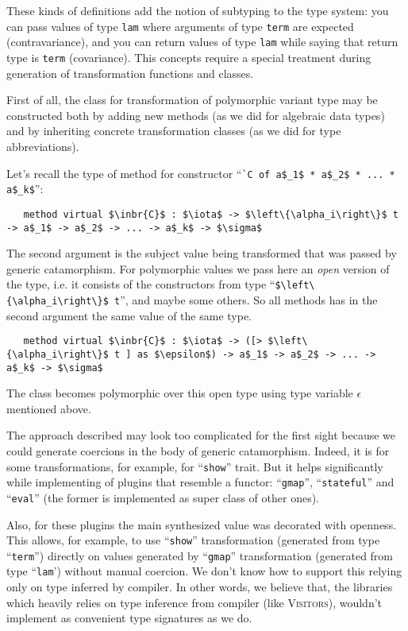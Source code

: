 These kinds of definitions add the notion of subtyping to the type system: you can pass values of type \lstinline=lam= where arguments of type \lstinline=term= are expected (contravariance), and you can return values of type \lstinline=lam= while saying that return type is \lstinline=term= (covariance). This concepts require a special treatment during generation of transformation functions and classes.

First of all, the class for transformation of polymorphic variant type may be constructed both by adding new methods (as we did for algebraic data types) and by inheriting concrete transformation classes (as we did for type abbreviations).

Let's recall the type of method for constructor ``\lstinline|`C of a$_1$ * a$_2$ * ... * a$_k$|'':
\begin{lstlisting}
   method virtual $\inbr{C}$ : $\iota$ -> $\left\{\alpha_i\right\}$ t -> a$_1$ -> a$_2$ -> ... -> a$_k$ -> $\sigma$
\end{lstlisting}

The second argument is the subject value being transformed that was passed  by generic catamorphism. For polymorphic values we pass here 
an \emph{open} version of the type, i.e. it consists of the constructors from type ``\lstinline|$\left\{\alpha_i\right\}$ t|'', and maybe some others. So all methods has in the second argument the same value of the same type.

\begin{lstlisting}
   method virtual $\inbr{C}$ : $\iota$ -> ([> $\left\{\alpha_i\right\}$ t ] as $\epsilon$) -> a$_1$ -> a$_2$ -> ... -> a$_k$ -> $\sigma$
\end{lstlisting}

The class becomes polymorphic over this open type using type variable $\epsilon$ mentioned above.

The approach described may look too complicated for the first sight because we could generate coercions in the body of generic catamorphism. Indeed, it is for some transformations, for example, for ``\lstinline|show|'' trait. But it helps significantly while implementing of plugins that resemble a functor: ``\lstinline|gmap|'', ``\lstinline|stateful|'' and ``\lstinline|eval|'' (the former is implemented as super class of other ones). 

Also, for these plugins the main synthesized value was decorated with openness. This allows, for example, to use ``\lstinline|show|'' transformation (generated from type ``\lstinline|term|'') directly on values generated by ``\lstinline|gmap|'' transformation (generated from type ``\lstinline|lam|') without manual coercion. We don't know how to support this relying only on type inferred by compiler. In other words, we believe that, the libraries which heavily  relies on type inference from compiler (like \textsc{Visitors}), wouldn't 
implement as convenient type signatures as we do.







